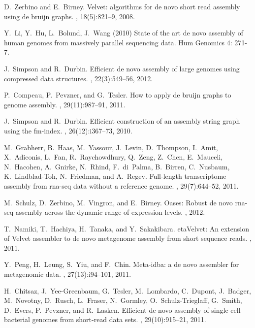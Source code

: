 \documentclass{pnastwo}
\begin{document}
\begin{article}
\begin{thebibliography}{20}
D.~Zerbino and E.~Birney.
\newblock Velvet: algorithms for de novo short read assembly using de bruijn
  graphs.
, 18(5):821--9, 2008.

Y.~Li, Y.~Hu, L.~Bolund, J.~Wang (2010)
\newblock State of the art de novo assembly of human genomes from massively parallel sequencing data.
\newblock Hum Genomics 4: 271-7.

J.~Simpson and R.~Durbin.
\newblock Efficient de novo assembly of large genomes using compressed data
  structures.
, 22(3):549--56, 2012.

P.~Compeau, P.~Pevzner, and G.~Tesler.
\newblock How to apply de bruijn graphs to genome assembly.
, 29(11):987--91, 2011.

J.~Simpson and R.~Durbin.
\newblock Efficient construction of an assembly string graph using the
  fm-index.
, 26(12):i367--73, 2010.

M.~Grabherr, B.~Haas, M.~Yassour, J.~Levin, D.~Thompson, I.~Amit, X.~Adiconis,
  L.~Fan, R.~Raychowdhury, Q.~Zeng, Z.~Chen, E.~Mauceli, N.~Hacohen, A.~Gnirke,
  N.~Rhind, F.~di~Palma, B.~Birren, C.~Nusbaum, K.~Lindblad-Toh, N.~Friedman,
  and A.~Regev.
\newblock Full-length transcriptome assembly from rna-seq data without a
  reference genome.
, 29(7):644--52, 2011.

M.~Schulz, D.~Zerbino, M.~Vingron, and E.~Birney.
\newblock Oases: Robust de novo rna-seq assembly across the dynamic range of
  expression levels.
, 2012.

T.~Namiki, T.~Hachiya, H.~Tanaka, and Y.~Sakakibara.
eta{V}elvet: {A}n extension of {V}elvet assembler to de novo
  metagenome assembly from short sequence reads.
, 2011.

Y.~Peng, H.~Leung, S.~Yiu, and F.~Chin.
\newblock Meta-idba: a de novo assembler for metagenomic data.
, 27(13):i94--101, 2011.

H.~Chitsaz, J.~Yee-Greenbaum, G.~Tesler, M.~Lombardo, C.~Dupont, J.~Badger,
  M.~Novotny, D.~Rusch, L.~Fraser, N.~Gormley, O.~Schulz-Trieglaff, G.~Smith,
  D.~Evers, P.~Pevzner, and R.~Lasken.
\newblock Efficient de novo assembly of single-cell bacterial genomes from
  short-read data sets.
, 29(10):915--21, 2011.


\end{thebibliography}
\end{article}
\end{document}
